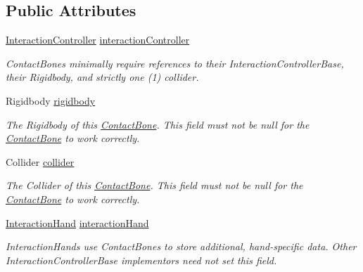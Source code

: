 \subsection*{Public Attributes}
\begin{DoxyCompactItemize}
\item 
\mbox{\hyperlink{class_leap_1_1_unity_1_1_interaction_1_1_interaction_controller}{Interaction\+Controller}} \mbox{\hyperlink{class_leap_1_1_unity_1_1_interaction_1_1_contact_bone_aa2aca8ef28781d61cf239aa51049c667}{interaction\+Controller}}
\begin{DoxyCompactList}\small\item\em Contact\+Bones minimally require references to their Interaction\+Controller\+Base, their Rigidbody, and strictly one (1) collider. \end{DoxyCompactList}\item 
Rigidbody \mbox{\hyperlink{class_leap_1_1_unity_1_1_interaction_1_1_contact_bone_af615ba6957558427e50254b0d412858d}{rigidbody}}
\begin{DoxyCompactList}\small\item\em The Rigidbody of this \mbox{\hyperlink{class_leap_1_1_unity_1_1_interaction_1_1_contact_bone}{Contact\+Bone}}. This field must not be null for the \mbox{\hyperlink{class_leap_1_1_unity_1_1_interaction_1_1_contact_bone}{Contact\+Bone}} to work correctly. \end{DoxyCompactList}\item 
Collider \mbox{\hyperlink{class_leap_1_1_unity_1_1_interaction_1_1_contact_bone_a10be22c6d9f833777f0308a596fa5bed}{collider}}
\begin{DoxyCompactList}\small\item\em The Collider of this \mbox{\hyperlink{class_leap_1_1_unity_1_1_interaction_1_1_contact_bone}{Contact\+Bone}}. This field must not be null for the \mbox{\hyperlink{class_leap_1_1_unity_1_1_interaction_1_1_contact_bone}{Contact\+Bone}} to work correctly. \end{DoxyCompactList}\item 
\mbox{\hyperlink{class_leap_1_1_unity_1_1_interaction_1_1_interaction_hand}{Interaction\+Hand}} \mbox{\hyperlink{class_leap_1_1_unity_1_1_interaction_1_1_contact_bone_a87f0ed05ef3a68fa7b4b2a616d396692}{interaction\+Hand}}
\begin{DoxyCompactList}\small\item\em Interaction\+Hands use Contact\+Bones to store additional, hand-\/specific data. Other Interaction\+Controller\+Base implementors need not set this field. \end{DoxyCompactList}\item 

\end{DoxyCompactItemize}
